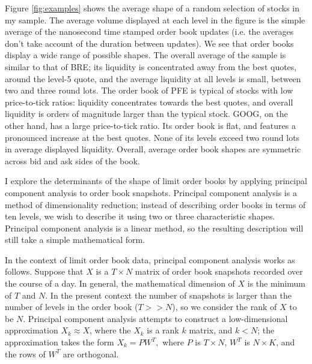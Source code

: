 Figure \ref{fig:examples} shows the average shape of a random selection of stocks in my sample. The average volume displayed at each level in the figure is the simple average of the nanosecond time stamped order book updates (i.e. the averages don't take account of the duration between updates). We see that order books display a wide range of possible shapes. The overall average of the sample is similar to that of BRE; its liquidity is concentrated away from the best quotes, around the level-5 quote, and the average liquidity at all levels is small, between two and three round lots.  The order book of PFE is typical of stocks with low price-to-tick ratios: liquidity concentrates towards the best quotes, and overall liquidity is orders of magnitude larger than the typical stock. GOOG, on the other hand, has a large price-to-tick ratio. Its order book is flat, and features a pronounced increase at the best quotes. None of its levels exceed two round lots in average displayed liquidity. Overall, average order book shapes are symmetric across bid and ask sides of the book.




I explore the determinants of the shape of limit order books by applying principal component analysis to order book snapshots. Principal component analysis is a method of dimensionality reduction; instead of describing order books in terms of ten levels, we wish to describe it using two or three characteristic shapes. Principal component analysis is a linear method, so the resulting description will still take a simple mathematical form.

In the context of limit order book data, principal component analysis works as follows. Suppose that $X$ is a $T \times N$ matrix of order book snapshots recorded over the course of a day. In general, the mathematical dimension of $X$ is the minimum of $T$ and $N$. In the present context the number of snapshots is larger than the number of levels in the order book ($T >> N$), so we consider the rank of $X$ to be $N$. Principal component analysis attempts to construct a low-dimensional approximation $X_k \approx X$, where the $X_k$ is a rank $k$ matrix, and $k < N$; the approximation takes the form $X_k = P W^T,$ where $P$ is $T \times N$, $W^T$ is $N \times K$, and the rows of $W^T$ are orthogonal.

